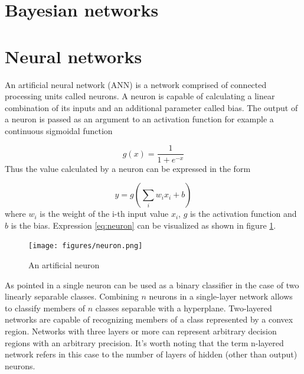 \documentclass[11pt,oneside, a4paper]{report}
\begin{document}
\section{Bayesian networks}
\section{Neural networks}
An artificial neural network (ANN) is a network comprised of connected processing units called neurons. A neuron is capable of calculating a linear combination of its inputs and an additional parameter called bias. The output of a neuron is passed as an argument to an activation function for example a continuous sigmoidal function

\begin{equation} \label{eq:sigmoid}
g(x) = \frac{1}{1 + e^{-x}}
\end{equation}
Thus the value calculated by a neuron can be expressed in the form

\begin{equation} \label{eq:neuron}
y = g(\sum_{i} w_i x_i + b)
\end{equation}
where $w_i$ is the weight of the i-th input value $x_i$, $g$ is the activation function and $b$ is the bias. Expression \ref{eq:neuron} can be visualized as shown in figure \ref{fig:neuron}.

\begin{figure}[htp]
\centering
\texttt{[image: figures/neuron.png]}
\caption{An artificial neuron}
\label{fig:neuron}
\end{figure}

As pointed in \cite{BISHOP1995} a single neuron can be used as a binary classifier in the case of two linearly separable classes. Combining $n$ neurons in a single-layer network allows to classify members of $n$ classes separable with a hyperplane. Two-layered networks are capable of recognizing members of a class represented by a convex region. Networks with three layers or more can represent arbitrary decision regions with an arbitrary precision.
It's worth noting that the term n-layered network refers in this case to the number of layers of hidden (other than output) neurons.
\end{document}
